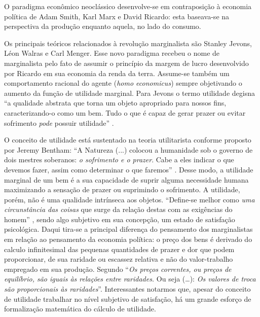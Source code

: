 \documentclass[a4paper, 12pt, openright, oneside, german, french, english, brazil]{abntex2}
\begin{document}
	O paradigma econômico neoclássico desenvolve-se em contraposição à economia política de Adam Smith, Karl Marx e David Ricardo: esta baseava-se na perspectiva da produção enquanto aquela, no lado do consumo.
	
	Os principais teóricos relacionados à revolução marginalista são Stanley Jevons, Léon Walras e Carl Menger. Esse novo paradigma recebeu o nome de marginalista pelo fato de assumir o princípio da margem de lucro desenvolvido por Ricardo em sua economia da renda da terra. Assume-se também um comportamento racional do agente (\textit{homo economicus}) sempre objetivando o aumento da função de utilidade marginal. Para Jevons o termo utilidade degisna ``a qualidade abstrata que torna um objeto apropriado para nossos fins, caracterizando-o como um bem. Tudo o que é capaz de gerar prazer ou evitar sofrimento \textit{pode} possuir utilidade'' \cite{jevons1996teoria}.
	
	O conceito de utilidade está sustentado na teoria utilitarista conforme proposto por Jeremy Bentham: ``A Natureza (...) colocou a humanidade sob o governo de dois mestres soberanos: \textit{o sofrimento e o prazer}. Cabe a eles indicar o que devemos fazer, assim como determinar o que faremos'' \cite[p. 59]{jevons1996teoria}. Desse modo, a utilidade marginal de um bem é a sua capacidade de suprir alguma necessidade humana maximizando a sensação de prazer ou suprimindo o sofrimento. A utilidade, porém, não é uma qualidade intrínseca aos objetos. ``Define-se melhor como \textit{uma circunstância das coisas} que surge da relação destas com as exigências do homem'' \cite[p. 73]{jevons1996teoria}, sendo algo subjetivo em sua concepção, um estado de satisfação psicológica. Daqui tira-se a principal diferença do pensamento dos marginalistas em relação ao pensamento da economia política: o preço dos bens é derivado do calculo infinitesimal das pequenas quantidades de prazer e dor que podem proporcionar, de sua raridade ou escassez relativa e não do valor-trabalho empregado em sua produção. Segundo  ``\textit{Os preços correntes, ou preços de equilíbrio, são iguais às relações entre raridades.} Ou seja (\ldots): \textit{Os valores de troca são proporcionais às raridades}''. Interessantes notarmos que, apesar do conceito de utilidade trabalhar no nível subjetivo de satisfação, há um grande esforço de formalização matemática do cálculo de utilidade.
	
\end{document}
